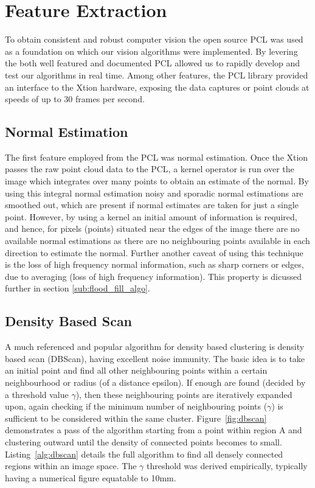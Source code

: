 \documentclass[]{article}
\begin{document}
{ %
\clearpage


\section{Feature Extraction} %
\label{sec:feature_extraction}

To obtain consistent and robust computer vision the open source PCL was used as a foundation on which our vision algorithms were implemented. By levering the both well featured and documented PCL allowed us to rapidly develop and test our algorithms in real time. Among other features, the PCL library provided an interface to the Xtion hardware, exposing the data captures or point clouds at speeds of up to 30 frames per second.

\subsection{Normal Estimation} %
\label{sub:normal_estimation}

The first feature employed from the PCL was normal estimation. Once the Xtion passes the raw point cloud data to the PCL, a kernel operator is run over the image which integrates over many points to obtain an estimate of the normal. By using this integral normal estimation noisy and sporadic normal estimations are smoothed out, which are present if normal estimates are taken for just a single point. However, by using a kernel an initial amount of information is required, and hence, for pixels (points) situated near the edges of the image there are no available normal estimations as there are no neighbouring points available in each direction to estimate the normal. Further another caveat of using this technique is the loss of high frequency normal information, such as sharp corners or edges, due to averaging (loss of high frequency information). This property is dicussed further in section \ref{sub:flood_fill_algo}. 
\subsection{Density Based Scan} %
\label{sub:density_based_scan}


A much referenced and popular algorithm for density based clustering is density based scan (DBScan), having excellent noise immunity. The basic idea is to take an initial point and find all other neighbouring points within a certain neighbourhood or radius (of a distance epsilon). If enough are found (decided by a threshold value $\gamma$), then these neighbouring points are iteratively expanded upon, again checking if the minimum number of neighbouring points ($\gamma$) is sufficient to be considered within the same cluster. Figure~\ref{fig:dbscan} demonstrates a pass of the algorithm starting from a point within region A and clustering outward until the density of connected points becomes to small. Listing~\ref{alg:dbscan} details the full algorithm to find all densely connected regions within an image space. The $\gamma$ threshold was derived empirically, typically having a numerical figure equatable to 10mm.  




}
\end{document}
